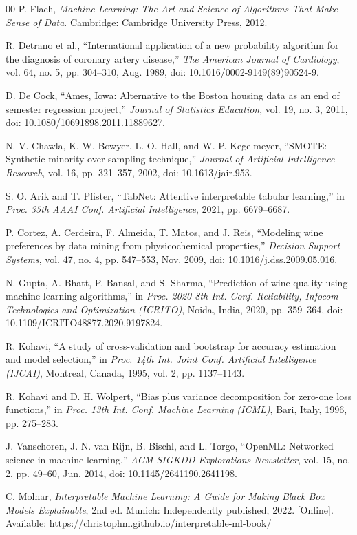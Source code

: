 \documentclass[conference]{IEEEtran}
\begin{document}
\begin{thebibliography}{00}
 P. Flach, \textit{Machine Learning: The Art and Science of Algorithms That Make Sense of Data}. Cambridge: Cambridge University Press, 2012.

 R. Detrano et al., ``International application of a new probability algorithm for the diagnosis of coronary artery disease,'' \textit{The American Journal of Cardiology}, vol. 64, no. 5, pp. 304--310, Aug. 1989, doi: 10.1016/0002-9149(89)90524-9.

 D. De Cock, ``Ames, Iowa: Alternative to the Boston housing data as an end of semester regression project,'' \textit{Journal of Statistics Education}, vol. 19, no. 3, 2011, doi: 10.1080/10691898.2011.11889627.

 N. V. Chawla, K. W. Bowyer, L. O. Hall, and W. P. Kegelmeyer, ``SMOTE: Synthetic minority over-sampling technique,'' \textit{Journal of Artificial Intelligence Research}, vol. 16, pp. 321--357, 2002, doi: 10.1613/jair.953.

 S. O. Arik and T. Pfister, ``TabNet: Attentive interpretable tabular learning,'' in \textit{Proc. 35th AAAI Conf. Artificial Intelligence}, 2021, pp. 6679--6687.

 P. Cortez, A. Cerdeira, F. Almeida, T. Matos, and J. Reis, ``Modeling wine preferences by data mining from physicochemical properties,'' \textit{Decision Support Systems}, vol. 47, no. 4, pp. 547--553, Nov. 2009, doi: 10.1016/j.dss.2009.05.016.

 N. Gupta, A. Bhatt, P. Bansal, and S. Sharma, ``Prediction of wine quality using machine learning algorithms,'' in \textit{Proc. 2020 8th Int. Conf. Reliability, Infocom Technologies and Optimization (ICRITO)}, Noida, India, 2020, pp. 359--364, doi: 10.1109/ICRITO48877.2020.9197824.

 R. Kohavi, ``A study of cross-validation and bootstrap for accuracy estimation and model selection,'' in \textit{Proc. 14th Int. Joint Conf. Artificial Intelligence (IJCAI)}, Montreal, Canada, 1995, vol. 2, pp. 1137--1143.

 R. Kohavi and D. H. Wolpert, ``Bias plus variance decomposition for zero-one loss functions,'' in \textit{Proc. 13th Int. Conf. Machine Learning (ICML)}, Bari, Italy, 1996, pp. 275--283.

 J. Vanschoren, J. N. van Rijn, B. Bischl, and L. Torgo, ``OpenML: Networked science in machine learning,'' \textit{ACM SIGKDD Explorations Newsletter}, vol. 15, no. 2, pp. 49--60, Jun. 2014, doi: 10.1145/2641190.2641198.

 C. Molnar, \textit{Interpretable Machine Learning: A Guide for Making Black Box Models Explainable}, 2nd ed. Munich: Independently published, 2022. [Online]. Available: https://christophm.github.io/interpretable-ml-book/

\end{thebibliography}
\end{document}
